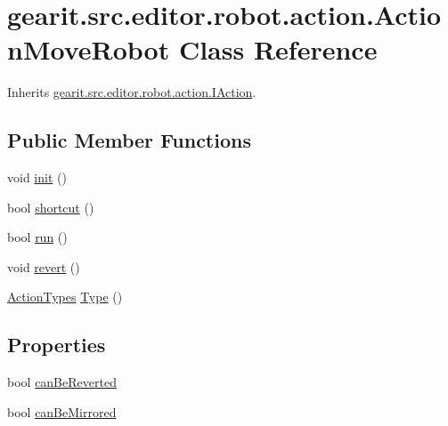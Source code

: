 \hypertarget{classgearit_1_1src_1_1editor_1_1robot_1_1action_1_1_action_move_robot}{\section{gearit.\+src.\+editor.\+robot.\+action.\+Action\+Move\+Robot Class Reference}
\label{classgearit_1_1src_1_1editor_1_1robot_1_1action_1_1_action_move_robot}
}


Inherits \hyperlink{interfacegearit_1_1src_1_1editor_1_1robot_1_1action_1_1_i_action}{gearit.\+src.\+editor.\+robot.\+action.\+I\+Action}.

\subsection*{Public Member Functions}
\begin{DoxyCompactItemize}
\item 
void \hyperlink{classgearit_1_1src_1_1editor_1_1robot_1_1action_1_1_action_move_robot_a414fb0acc1bf8c07f8edb376461bdc3a}{init} ()
\item 
bool \hyperlink{classgearit_1_1src_1_1editor_1_1robot_1_1action_1_1_action_move_robot_ab331d44ce9a71c1e33f53abcdb0dcb09}{shortcut} ()
\item 
bool \hyperlink{classgearit_1_1src_1_1editor_1_1robot_1_1action_1_1_action_move_robot_ace5dca3b5ba6149c7edc195517ea11fa}{run} ()
\item 
void \hyperlink{classgearit_1_1src_1_1editor_1_1robot_1_1action_1_1_action_move_robot_ae918a5c370ec676db1cd40b2b7039331}{revert} ()
\item 
\hyperlink{namespacegearit_1_1src_1_1editor_1_1robot_1_1action_a4be0fd46e3952d6135136b20e7b3fc5e}{Action\+Types} \hyperlink{classgearit_1_1src_1_1editor_1_1robot_1_1action_1_1_action_move_robot_a59af165806c6c013046a0c5f8d56308a}{Type} ()
\end{DoxyCompactItemize}
\subsection*{Properties}
\begin{DoxyCompactItemize}
\item 
bool \hyperlink{classgearit_1_1src_1_1editor_1_1robot_1_1action_1_1_action_move_robot_a2e5390e27ae4d0fee1caab19539fe0e8}{can\+Be\+Reverted}
\item 
bool \hyperlink{classgearit_1_1src_1_1editor_1_1robot_1_1action_1_1_action_move_robot_acc667c8c7208f23a4acfe2ff62fd2e96}{can\+Be\+Mirrored}
\end{DoxyCompactItemize}


